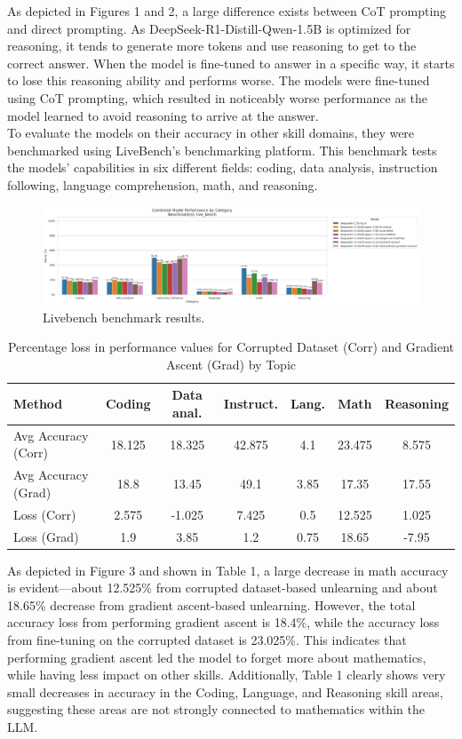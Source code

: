 \documentclass[10pt]{article}
\begin{document}
As depicted in Figures 1 and 2, a large difference exists between CoT prompting and direct prompting. As DeepSeek-R1-Distill-Qwen-1.5B is optimized for reasoning, it tends to generate more tokens and use reasoning to get to the correct answer. When the model is fine-tuned to answer in a specific way, it starts to lose this reasoning ability and performs worse. The models were fine-tuned using CoT prompting, which resulted in noticeably worse performance as the model learned to avoid reasoning to arrive at the answer. 
\\
To evaluate the models on their accuracy in other skill domains, they were benchmarked using LiveBench's benchmarking platform. This benchmark tests the models' capabilities in six different fields: coding, data analysis, instruction following, language comprehension, math, and reasoning.
\begin{figure}[h]
    \centering
    \includegraphics[width=0.9\linewidth]{combined_group_scores_live_bench.png}
    \caption{Livebench benchmark results.}
    \label{fig:bench_and_direct}
\end{figure}
\begin{table}[h]
\centering
\tiny
\caption{Percentage loss in performance values for Corrupted Dataset (Corr) and Gradient Ascent (Grad) by Topic}
\label{tab:loss}
\setlength{\tabcolsep}{3.5pt}
\begin{tabular}{|l|c|c|c|c|c|c|}
\hline
\textbf{Method} & \textbf{Coding} & \textbf{Data anal.} & \textbf{Instruct.} & \textbf{Lang.} & \textbf{Math} & \textbf{Reasoning} \\ \hline
Avg Accuracy (Corr) & 18.125 & 18.325 & 42.875 & 4.1 & 23.475 & 8.575 \\ \hline
Avg Accuracy (Grad) & 18.8 & 13.45 & 49.1 & 3.85 & 17.35 & 17.55 \\ \hline
Loss (Corr) & 2.575 & -1.025 & 7.425 & 0.5 & 12.525 & 1.025  \\ \hline
Loss (Grad) & 1.9 & 3.85 & 1.2 & 0.75 & 18.65 & -7.95  \\ \hline
\end{tabular}
\end{table}

As depicted in Figure 3 and shown in Table 1, a large decrease in math accuracy is evident—about 12.525\% from corrupted dataset-based unlearning and about 18.65\% decrease from gradient ascent-based unlearning. However, the total accuracy loss from performing gradient ascent is 18.4\%, while the accuracy loss from fine-tuning on the corrupted dataset is 23.025\%. This indicates that performing gradient ascent led the model to forget more about mathematics, while having less impact on other skills. Additionally, Table 1 clearly shows very small decreases in accuracy in the Coding, Language, and Reasoning skill areas, suggesting these areas are not strongly connected to mathematics within the LLM.
\end{document}
